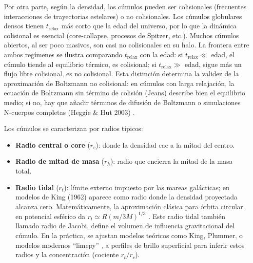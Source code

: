     Por otra parte, según la densidad, los cúmulos pueden ser colisionales 
    (frecuentes interacciones de trayectorias estelares) o no colisionales. Los 
    cúmulos globulares densos tienen $t_\text{relax}$ más corto que la edad del 
    universo, por lo que la dinámica colisional es esencial (core-collapse, 
    procesos de Spitzer, etc.). Muchos cúmulos abiertos, al ser poco masivos, 
    son casi no colisionales en su halo. La frontera entre ambos regímenes se 
    ilustra comparando $t_\text{relax}$ con la edad: si $t_\text{relax} \ll$ 
    edad, el cúmulo tiende al equilibrio térmico, es colisional; si 
    $t_\text{relax} \gg $ edad, sigue más un flujo libre colisional, es no 
    colisional. Esta distinción determina la validez de la aproximación de 
    Boltzmann no colisional: en cúmulos con larga relajación, la ecuación de 
    Boltzmann sin término de colisión (Jeans) describe bien el equilibrio medio; 
    si no, hay que añadir términos de difusión de Boltzmann o simulaciones 
    N-cuerpos completas (Heggie \& Hut 2003) \cite{heggie2003book}.

    Los cúmulos se caracterizan por radios típicos:

    \begin{itemize}
        \item \textbf{Radio central o core} ($r_c$): donde la densidad cae a la 
            mitad del centro.

        \item \textbf{Radio de mitad de masa} ($r_h$): radio que encierra la 
            mitad de la masa total.

        \item \textbf{Radio tidal} ($r_t$): límite externo impuesto por las 
            mareas galácticas; en modelos de King (1962) aparece como radio 
            donde la densidad proyectada alcanza cero. Matemáticamente, la 
            aproximación clásica para órbita circular en potencial esférico da 
            $r_t \simeq R(m/3M)^{1/3}$ \cite{Spitzer1987}. Este radio tidal 
            también llamado radio de Jacobi, define el volumen de influencia 
            gravitacional del cúmulo. En la práctica, se ajustan modelos 
            teóricos como King, Plummer, o modelos modernos ``limepy'' 
            \cite{Cheng2023}, a perfiles de brillo superficial para inferir 
            estos radios y la concentración (cociente $r_t/r_c$). 
    \end{itemize}

